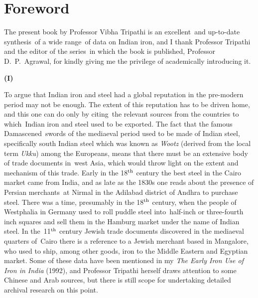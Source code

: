 \chapter*{Foreword}\label{preface}

\vspace{-.7cm}

The present book by Professor Vibha Tripathi is an excellent and up-to-date synthesis of a wide range of data on Indian iron, and I thank Professor Tripathi and the editor of the series in which the book is published, Professor D.~P.~Agrawal, for kindly giving me the privilege of academically introducing it.

\vspace{-.3cm}

\begin{center}{\textbf{(I)}}\end{center}

\vspace{-.3cm}

To argue that Indian iron and steel had a global reputation in the pre-modern period may not be enough. The extent of this reputation has to be driven home, and this one can do only by citing the relevant sources from the countries to which Indian iron and steel used to be exported. The fact that the famous Damascened swords of the mediaeval period used to be made of Indian steel, specifically south Indian steel which was known as \textit{Wootz} (derived from the local term \textit{Ukku}) among the Europeans, means that there must be an extensive body of trade documents in west Asia, which would throw light on the extent and mechanism of this trade. Early in the 18$^{\rm th}$ century the best steel in the Cairo market came from India, and as late as the 1830s one reads about the presence of Persian merchants at Nirmal in the Adilabad district of Andhra to purchase steel. There was a time, presumably in the 18$^{\rm th}$ century, when the people of Westphalia in Germany used to roll puddle steel into half-inch or three-fourth inch squares and sell them in the Hamburg market under the name of Indian steel. In the 11$^{\rm th}$ century Jewish trade documents discovered in the mediaeval quarters of Cairo there is a reference to a Jewish merchant based in Mangalore, who used to ship, among other goods, iron to the Middle Eastern and Egyptian market. Some of these data have been mentioned in my \textit{The Early Iron Use of Iron in India} (1992), and Professor Tripathi herself draws attention to some Chinese and Arab sources, but there is still scope for undertaking detailed archival research on this point. 

